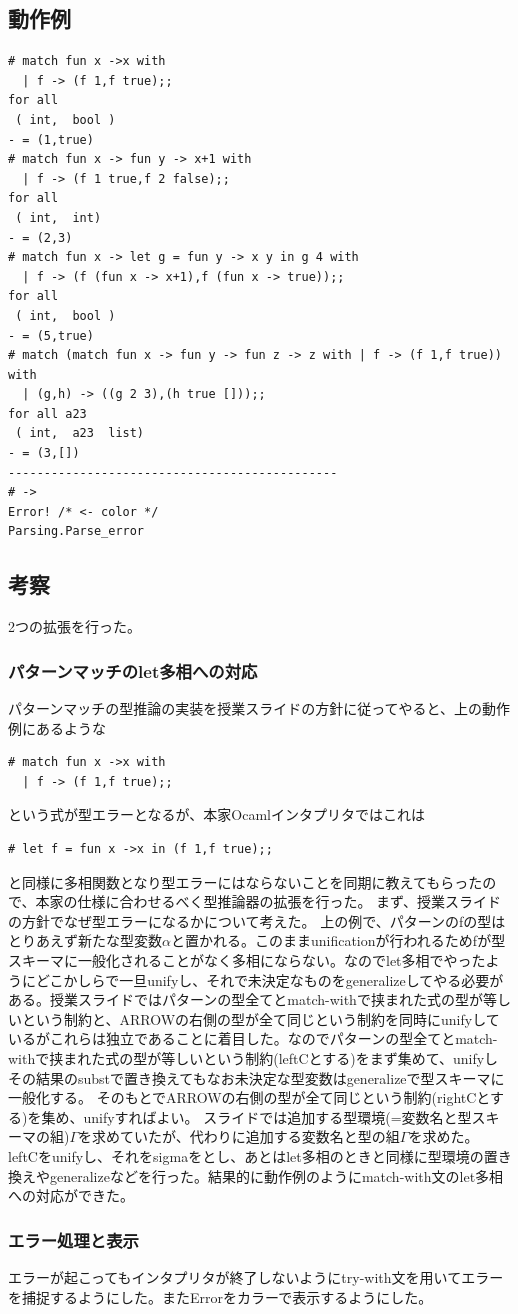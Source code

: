 \documentclass[11pt,a4paper]{jsarticle}
\begin{document}
\subsection*{動作例}
\begin{lstlisting}[basicstyle=\ttfamily\footnotesize, frame=single]
# match fun x ->x with
  | f -> (f 1,f true);;
for all 
 ( int,  bool )
- = (1,true)
# match fun x -> fun y -> x+1 with
  | f -> (f 1 true,f 2 false);;
for all 
 ( int,  int)
- = (2,3)
# match fun x -> let g = fun y -> x y in g 4 with
  | f -> (f (fun x -> x+1),f (fun x -> true));;
for all 
 ( int,  bool )
- = (5,true)
# match (match fun x -> fun y -> fun z -> z with | f -> (f 1,f true)) with
  | (g,h) -> ((g 2 3),(h true []));;
for all a23 
 ( int,  a23  list)
- = (3,[])
----------------------------------------------
# ->
Error! /* <- color */
Parsing.Parse_error
\end{lstlisting}
\subsection*{考察}
2つの拡張を行った。
\subsubsection*{パターンマッチのlet多相への対応}
パターンマッチの型推論の実装を授業スライドの方針に従ってやると、上の動作例にあるような
\begin{lstlisting}[basicstyle=\ttfamily\footnotesize, frame=single]
# match fun x ->x with
  | f -> (f 1,f true);;
\end{lstlisting}
という式が型エラーとなるが、本家Ocamlインタプリタではこれは
\begin{lstlisting}[basicstyle=\ttfamily\footnotesize, frame=single]
# let f = fun x ->x in (f 1,f true);;
\end{lstlisting}
と同様に多相関数となり型エラーにはならないことを同期に教えてもらったので、本家の仕様に合わせるべく型推論器の拡張を行った。
まず、授業スライドの方針でなぜ型エラーになるかについて考えた。
上の例で、パターンのfの型はとりあえず新たな型変数$\alpha$と置かれる。このままunificationが行われるためfが型スキーマに一般化されることがなく多相にならない。なのでlet多相でやったようにどこかしらで一旦unifyし、それで未決定なものをgeneralizeしてやる必要がある。授業スライドではパターンの型全てとmatch-withで挟まれた式の型が等しいという制約と、ARROWの右側の型が全て同じという制約を同時にunifyしているがこれらは独立であることに着目した。なのでパターンの型全てとmatch-withで挟まれた式の型が等しいという制約(leftCとする)をまず集めて、unifyしその結果のsubstで置き換えてもなお未決定な型変数はgeneralizeで型スキーマに一般化する。
そのもとでARROWの右側の型が全て同じという制約(rightCとする)を集め、unifyすればよい。
スライドでは追加する型環境(=変数名と型スキーマの組)$\Gamma$を求めていたが、代わりに追加する変数名と型の組$\Gamma$を求めた。
leftCをunifyし、それをsigmaをとし、あとはlet多相のときと同様に型環境の置き換えやgeneralizeなどを行った。結果的に動作例のようにmatch-with文のlet多相への対応ができた。
\subsubsection*{エラー処理と表示}
エラーが起こってもインタプリタが終了しないようにtry-with文を用いてエラーを捕捉するようにした。またErrorをカラーで表示するようにした。
\end{document}
